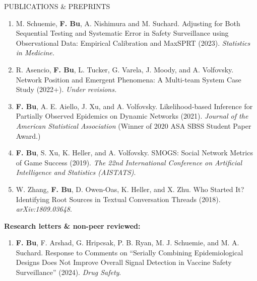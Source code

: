 \documentclass{resume} %
\newcommand{\myName}[1]{\textbf{#1}}
\begin{document}
\begin{rSection}{PUBLICATIONS \& PREPRINTS}
\begin{enumerate}[{label=\arabic*\addtocounter{enumi}{-2}., itemsep=3pt, parsep=0pt, topsep=3pt, start=\value{pubtotal}, leftmargin=0pt}]
	\item 
	M. Schuemie, \myName{F. Bu}, A. Nishimura and M. Suchard.
	Adjusting for Both Sequential Testing and Systematic Error in Safety Surveillance using Observational Data: Empirical Calibration and MaxSPRT (2023). \emph{Statistics in Medicine.}
	
	\item
	R. Asencio, \myName{F. Bu}, L. Tucker, G. Varela, J. Moody, and A. Volfovsky. 
	Network Position and Emergent Phenomena: A Multi-team System Case Study (2022+). \emph{Under revisions.}
	
	\item 
	\myName{F. Bu}, A. E. Aiello, J. Xu, and A. Volfovsky. 
	Likelihood-based Inference for Partially Observed Epidemics on Dynamic Networks (2021). \emph{Journal of the American Statistical Association} (Winner of 2020 ASA SBSS Student Paper Award.) %
	
	\item 
	\myName{F. Bu}, S. Xu, K. Heller, and A. Volfovsky. 
	SMOGS: Social Network Metrics of Game Success (2019). \emph{The 22nd International Conference on Artificial Intelligence and Statistics (AISTATS)}. %
	
	\item 
	W. Zhang, \myName{F. Bu}, D. Owen-Oas, K. Heller, and X. Zhu. 
	Who Started It? Identifying Root Sources in Textual Conversation Threads (2018). \emph{arXiv:1809.03648}.
	
\end{enumerate}

\hspace{-.2in} \textbf{Research letters \& non-peer reviewed:}

\begin{enumerate}[{label=\arabic*\addtocounter{enumi}{-2}., itemsep=3pt, parsep=0pt, topsep=3pt, resume, leftmargin=0pt}]
	\item \myName{F. Bu}, F. Arshad, G. Hripcsak, P. B. Ryan, M. J. Schuemie, and M. A. Suchard. Response to Comments on ``Serially Combining Epidemiological Designs Does Not Improve Overall Signal Detection in Vaccine Safety Surveillance'' (2024). \emph{Drug Safety}. 
	
\end{enumerate}

\end{rSection}


\end{document}
